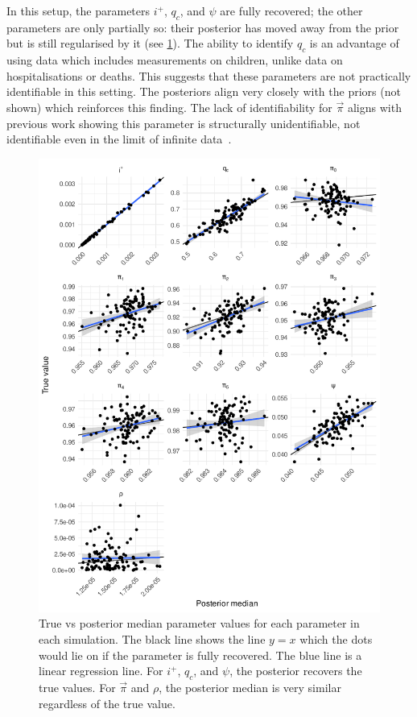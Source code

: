 \documentclass[thesis.tex]{subfiles}
\begin{document}
In this setup, the parameters $i^+$, $q_c$, and $\psi$ are fully recovered; the other parameters are only partially so: their posterior has moved away from the prior but is still regularised by it (see \cref{SEIR:fig:true-vs-posterior}).
The ability to identify $q_c$ is an advantage of using data which includes measurements on children, unlike data on hospitalisations or deaths.
This suggests that these parameters are not practically identifiable in this setting.
The posteriors align very closely with the priors (not shown) which reinforces this finding.
The lack of identifiability for $\vec{\pi}$ aligns with previous work showing this parameter is structurally unidentifiable, \ie not identifiable even in the limit of infinite data~\autocite{dankwaStructural}.
\begin{figure}
    \includegraphics{SEIR/sim/true_vs_posterior}
    \caption[True vs posterior parameter values]{%
        True vs posterior median parameter values for each parameter in each simulation.
        The black line shows the line $y = x$ which the dots would lie on if the parameter is fully recovered.
        The blue line is a linear regression line.
        For $i^+$, $q_c$, and $\psi$, the posterior recovers the true values.
        For $\vec{\pi}$ and $\rho$, the posterior median is very similar regardless of the true value.
    }
    \label{SEIR:fig:true-vs-posterior}
\end{figure}
\end{document}
